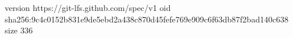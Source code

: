 version https://git-lfs.github.com/spec/v1
oid sha256:9c4c0152b831e9de5ebd2a438c870d45fefe769e909c6f63db87f2bad140c638
size 336
